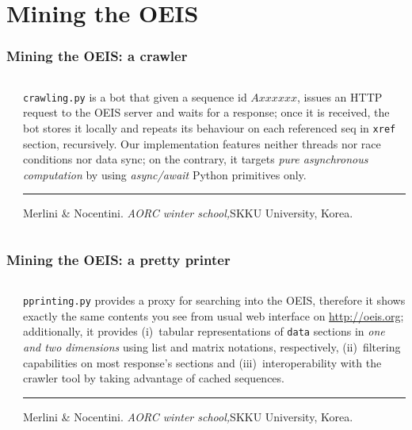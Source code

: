 \documentclass[9pt]{beamer}
\begin{document}
\section{Mining the OEIS}

\begin{frame}[fragile]
\frametitle{Mining the OEIS: a crawler}
\begin{columns}
    \begin{column}{0.5\textwidth}
    \end{column}
    \begin{column}{0.5\textwidth}
    \verb|crawling.py| is a bot that given a sequence id $Axxxxxx$, issues an
    HTTP request to the OEIS server and waits for a response; once it is
    received, the bot stores it locally and repeats its behaviour on each
    referenced seq in \verb|xref| section, recursively. Our implementation
    features neither threads nor race conditions nor data sync; on the
    contrary, it targets \textit{pure asynchronous computation} by using
    \textit{async/await} Python primitives only.
    \vfill
    \noindent\rule{\textwidth}{0.1pt}
    {\footnotesize Merlini \& Nocentini. \textit{AORC winter school,}\newline  SKKU University, Korea.}
    \end{column}
\end{columns}
\end{frame}

\begin{frame}[fragile]
\frametitle{Mining the OEIS: a pretty printer}
\begin{columns}
    \begin{column}{0.5\textwidth}
    \end{column}
    \begin{column}{0.5\textwidth}
    \verb|pprinting.py| provides a proxy for searching into the OEIS,
    therefore it shows exactly the same contents you see from usual web interface
    on \url{http://oeis.org}; additionally, it provides (i)~tabular representations
    of \verb|data| sections in \textit{one and two dimensions} using list and
    matrix notations, respectively, (ii)~filtering capabilities on most response's
    sections and (iii)~interoperability with the crawler tool by taking advantage of
    cached sequences.
    \vfill
    \noindent\rule{\textwidth}{0.1pt}
    {\footnotesize Merlini \& Nocentini. \textit{AORC winter school,}\newline  SKKU University, Korea.}
    \end{column}
\end{columns}
\end{frame}
\end{document}
